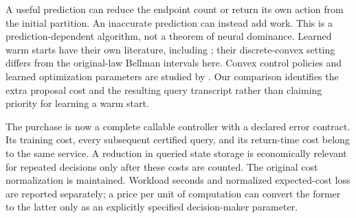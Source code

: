A useful prediction can reduce the endpoint count or return its own action from the initial partition. An inaccurate prediction can instead add work. This is a prediction-dependent algorithm, not a theorem of neural dominance. Learned warm starts have their own literature, including \citet{sakaue2023warm}; their discrete-convex setting differs from the original-law Bellman intervals here. Convex control policies and learned optimization parameters are studied by \citet{agrawal2020control}. Our comparison identifies the extra proposal cost and the resulting query transcript rather than claiming priority for learning a warm start.

The purchase is now a complete callable controller with a declared error contract. Its training cost, every subsequent certified query, and its return-time cost belong to the same service. A reduction in queried state storage is economically relevant for repeated decisions only after these costs are counted. The original cost normalization is maintained. Workload seconds and normalized expected-cost loss are reported separately; a price per unit of computation can convert the former to the latter only as an explicitly specified decision-maker parameter.
